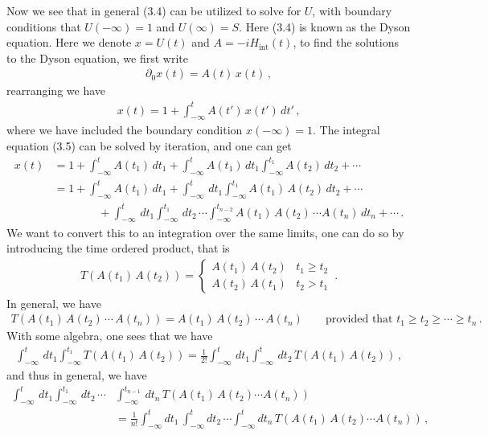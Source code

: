 \documentclass[11pt, onesided]{book}
\theoremstyle{break}
\theoremstyle{break}
\newcommand{\pd}{\partial}
\begin{document}
Now we see that in general (3.4) can be utilized to solve for $U$, with boundary conditions that $U(-\infty) = 1$ and $U(\infty) = S$. Here (3.4) is known as the Dyson equation. Here we denote $x = U(t)$ and $A = -iH_{\text{int}}(t)$, to find the solutions to the Dyson equation, we first write
\begin{align*}
\pd_0 x(t) = A(t) \, x(t)\,,
\end{align*}
rearranging we have
\begin{align}
x(t) = 1+ \int_{-\infty}^t A(t')\, x(t') \, dt'\,,
\end{align}
where we have included the boundary condition $x(-\infty) = 1$. The integral equation (3.5) can be solved by iteration, and one can get
\begin{align*}
x(t) 
&= 1 + \int_{-\infty}^t A(t_1)\, dt_1 + \int_{-\infty}^t A(t_1)\, dt_1 \int_{-\infty}^{t_1}  A(t_2)\,  dt_2  + \cdots \\
&= 1 + \int_{-\infty}^t A(t_1)\, dt_1 + \int_{-\infty}^t \, dt_1 \int_{-\infty}^{t_1}   A(t_1)\,A(t_2)\,  dt_2  + \cdots \\
&{}\qquad\qquad +\int_{-\infty}^t \, dt_1 \int_{-\infty}^{t_1}\, dt_2\,\cdots\int_{-\infty}^{t_{n-2}}A(t_1)\,A(t_2)\,\cdots A(t_n)\, dt_n + \cdots\,.
\end{align*}
We want to convert this to an integration over the same limits, one can do so by introducing the time ordered product, that is
\begin{align*}
T(A(t_1)\, A(t_2)) = \begin{cases}
A(t_1)\, A(t_2) & t_1 \geq t_2\\
A(t_2)\, A(t_1) & t_2 > t_1
\end{cases}\,.
\end{align*}
In general, we have
\begin{align*}
T(A(t_1)\, A(t_2)\,\cdots \, A(t_n)) = A(t_1)\, A(t_2)\,\cdots \, A(t_n) \qquad \text{provided that }t_1\geq t_2\geq \cdots\geq t_n\,.
\end{align*}
With some algebra, one sees that we have
\begin{align*}
\int_{-\infty}^t \, dt_1 \int_{-\infty}^{t_1}T(A(t_1)\, A(t_2)) = \frac{1}{2!}\int_{-\infty}^t\, dt_1\int_{-\infty}^t \, dt_2\, T(A(t_1) \, A(t_2))\,,
\end{align*}
and thus in general, we have
\begin{align*}
\int_{-\infty}^t\, dt_1\int_{-\infty}^{t_1}\, dt_2\,\cdots &\int_{-\infty}^{t_{n-1}}\, dt_n\, T\left( A(t_1)\,A(t_2) \cdots A(t_n)\right) \\
&= \frac{1}{n!}\int_{-\infty}^t dt_1 \,\int_{-\infty}^t dt_2\, \cdots \int_{-\infty}^t dt_n \, T(A(t_1)\,A(t_2)\cdots A(t_n))\,,
\end{align*}
\end{document}
